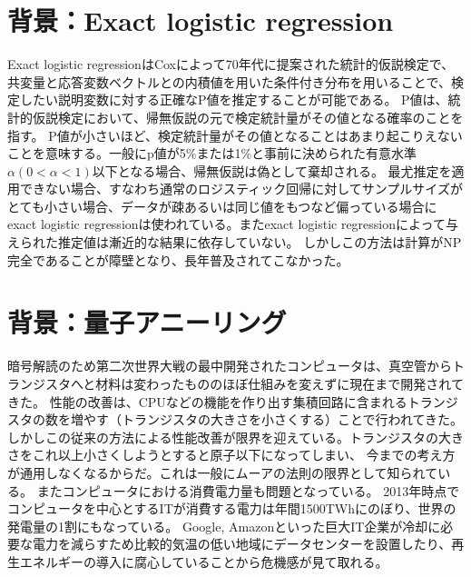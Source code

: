 \documentclass[12pt, dvipdfmx]{jmaster}
\theoremstyle{definition}
\begin{document}
\section{背景：Exact logistic regression}
Exact logistic regressionはCoxによって70年代に提案された統計的仮説検定で、共変量と応答変数ベクトルとの内積値を用いた条件付き分布を用いることで、検定したい説明変数に対する正確なP値を推定することが可能である\cite{cox1970analysis}。
P値は、統計的仮説検定において、帰無仮説の元で検定統計量がその値となる確率のことを指す。
P値が小さいほど、検定統計量がその値となることはあまり起こりえないことを意味する。一般にp値が5\%または1\%と事前に決められた有意水準$α(0<α<1)$以下となる場合、帰無仮説は偽として棄却される。
最尤推定を適用できない場合、すなわち通常のロジスティック回帰に対してサンプルサイズがとても小さい場合、データが疎あるいは同じ値をもつなど偏っている場合にexact logistic regressionは使われている\cite{10.2307/2288420, 10.2307/2289388, mehta1998exact, mehta1995exact}。またexact logistic regressionによって与えられた推定値は漸近的な結果に依存していない。
しかしこの方法は計算がNP完全であることが障壁となり、長年普及されてこなかった\cite{10.2307/2289388}。

\section{背景：量子アニーリング}
暗号解読のため第二次世界大戦の最中開発されたコンピュータは、真空管からトランジスタへと材料は変わったもののほぼ仕組みを変えずに現在まで開発されてきた。
性能の改善は、CPUなどの機能を作り出す集積回路に含まれるトランジスタの数を増やす（トランジスタの大きさを小さくする）ことで行われてきた。
しかしこの従来の方法による性能改善が限界を迎えている。トランジスタの大きさをこれ以上小さくしようとすると原子以下になってしまい、
今までの考え方が通用しなくなるからだ。これは一般にムーアの法則の限界として知られている。
またコンピュータにおける消費電力量も問題となっている。
2013年時点でコンピュータを中心とするITが消費する電力は年間1500TWhにのぼり、世界の発電量の1割にもなっている。
Google, Amazonといった巨大IT企業が冷却に必要な電力を減らすため比較的気温の低い地域にデータセンターを設置したり、再生エネルギーの導入に腐心していることから危機感が見て取れる。
\end{document}
